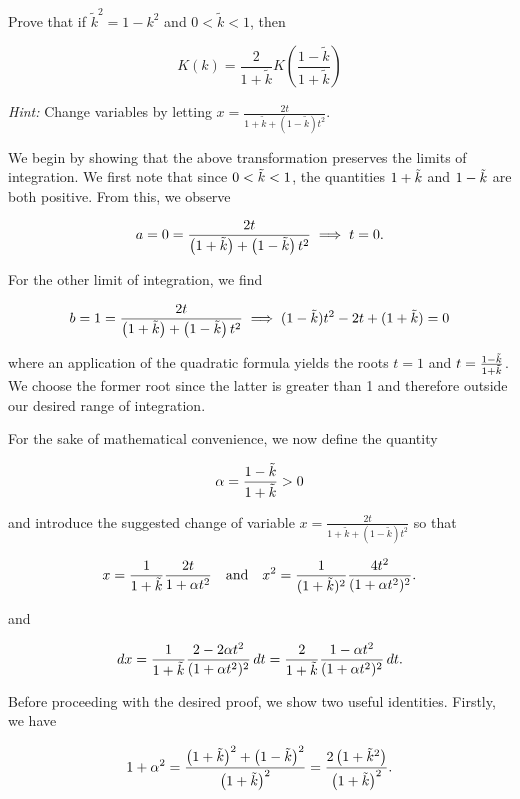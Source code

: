 Prove that if $\tilde{k}^2 = 1 - k^2$ and $0 < \tilde{k} < 1$, then

$$
K(k) = \frac{2}{1 + \tilde{k}} K\left(\frac{1 - \tilde{k}}{1 + \tilde{k}} \right)
$$

\textit{Hint:} Change variables by letting $x = \frac{2t}{1 + \tilde{k} + \left(1 - \tilde{k}\right) t^2}$.

\begin{solution}
  We begin by showing that the above transformation preserves the limits of integration. We first note that since 
  $0 < \tilde{k} < 1$, the quantities $1 + \tilde{k}$ and $1 - \tilde{k}$ are both positive. From this, we observe 

  $$
  a = 0
    = \frac{2t}{\left(1 + \tilde{k}\right) + \left(1 - \tilde{k}\right) t^2}
      \implies t = 0.
  $$

  For the other limit of integration, we find

  $$
  b = 1 
    = \frac{2t}{\left(1 + \tilde{k}\right) + \left(1 - \tilde{k}\right) t^2}
      \implies (1 - \tilde{k})t^2 - 2t + (1 + \tilde{k}) = 0
  $$

  where an application of the quadratic formula yields the roots $t = 1$ and $t = \frac{1 - \tilde{k}}{1 + \tilde{k}}$. We choose
  the former root since the latter is greater than 1 and therefore outside our desired range of integration. 
  
  For the sake of mathematical convenience, we now define the quantity 
  
  $$
  \alpha = \frac{1 - \tilde{k}}{1 + \tilde{k}} > 0
  $$ 
  
  and introduce the suggested change of variable $x = \frac{2t}{1 + \tilde{k} + \left(1 - \tilde{k}\right) t^2}$ so that 
 
  $$
    x = \frac{1}{1 + \tilde{k}}\frac{2t}{1 + \alpha t^2} \quad \text{and} \quad x^2 = \frac{1}{(1 + \tilde{k})^2}\frac{4t^2}{(1 + \alpha t^2)^2}.
  $$

  and 

  $$
  dx = \frac{1}{1 + \tilde{k}} \frac{2 - 2 \alpha t^2}{(1 + \alpha t^2)^2} \, dt 
     = \frac{2}{1 + \tilde{k}} \frac{1 - \alpha t^2}{(1 + \alpha t^2)^2} \, dt.
  $$

  Before proceeding with the desired proof, we show two useful identities. Firstly, we have

  \begin{equation} \label{eq:5b-identity-the-first}
    1 + \alpha^2 = \frac{\left(1 + \tilde{k}\right)^2 + \left(1 - \tilde{k}\right)^2}{\left(1 + \tilde{k}\right)^2}
                 = \frac{2\left(1 + \tilde{k}^2\right)}{\left(1 + \tilde{k}\right)^2}.
  \end{equation}


\end{solution}

